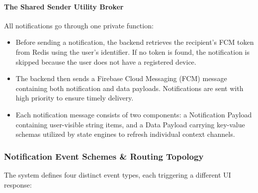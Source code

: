 \paragraph{The Shared Sender Utility Broker}
All notifications go through one private function:
\begin{itemize}
    \item Before sending a notification, the backend retrieves the recipient's FCM token from Redis using the user's identifier. If no token is found, the notification is skipped because the user does not have a registered device.
    \item The backend then sends a Firebase Cloud Messaging (FCM) message containing both notification and data payloads. Notifications are sent with high priority to ensure timely delivery.
    \item Each notification message consists of two components: a Notification Payload containing user-visible string items, and a Data Payload carrying key-value schemas utilized by state engines to refresh individual context channels.
\end{itemize}

\subsubsection{Notification Event Schemes \& Routing Topology}
The system defines four distinct event types, each triggering a different UI response:
\begin{table}[H]
\centering
\caption{Notification Events and Actions}
\label{tab:notification_events}
\end{table}

